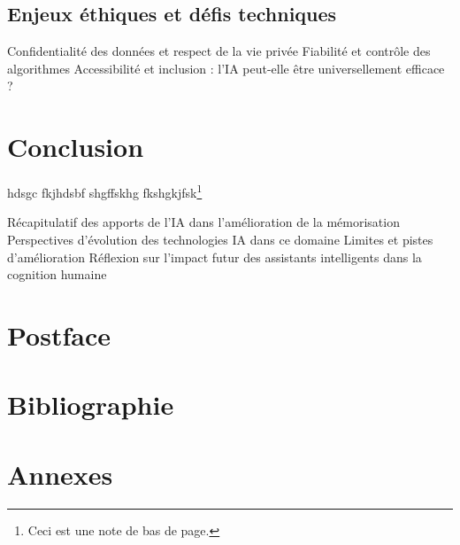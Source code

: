 \documentclass[12pt,a4paper]{report}
\begin{document}
\section{Enjeux éthiques et défis techniques}
Confidentialité des données et respect de la vie privée
Fiabilité et contrôle des algorithmes
Accessibilité et inclusion : l'IA peut-elle être universellement efficace ?

\chapter*{Conclusion}
hdsgc fkjhdsbf shgffskhg fkshgkjfsk\footnote{Ceci est une note de bas de page.}

Récapitulatif des apports de l'IA dans l'amélioration de la mémorisation
Perspectives d'évolution des technologies IA dans ce domaine
Limites et pistes d'amélioration
Réflexion sur l'impact futur des assistants intelligents dans la cognition humaine



\chapter*{Postface}

\chapter*{Bibliographie}

\chapter*{Annexes}
\end{document}
